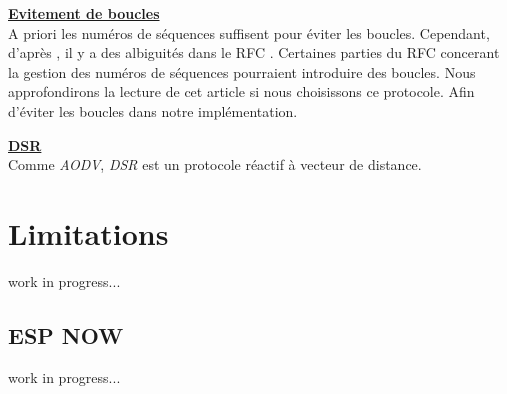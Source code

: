 \documentclass[a4paper, 12pt]{report}
\begin{document}
        \underline{\textbf{Evitement de boucles}}\\
            A priori les numéros de séquences suffisent pour éviter les boucles. Cependant, d'après \cite{loop_aodv_w}, il y a des
            albiguités dans le RFC \cite{aodv_w}. Certaines parties du RFC concerant la gestion des numéros de séquences pourraient introduire
            des boucles. Nous approfondirons la lecture de cet article si nous choisissons ce protocole. Afin d'éviter les boucles dans notre implémentation.

    \underline{\textbf{DSR}}\\
        Comme \textit{AODV}, \textit{DSR} est un protocole réactif à vecteur de distance.\\
        

\section{Limitations}
        work in progress...

    \subsection{ESP NOW}
        work in progress...

{}

\end{document}
